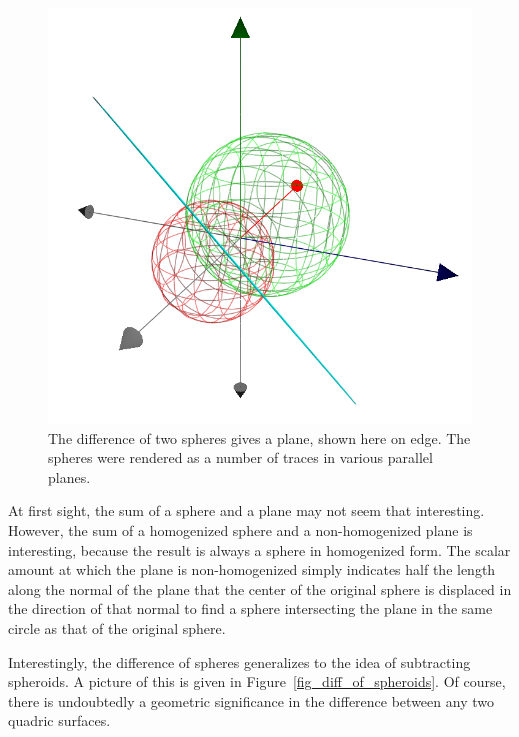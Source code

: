 \documentclass{ecgd-l}
\theoremstyle{definition}
\theoremstyle{remark}
\numberwithin{equation}{section}
\begin{document}
\begin{figure}
\includegraphics[scale=0.7]{DiffOfSpheres}
\caption{The difference of two spheres gives a plane, shown here on edge.  The spheres were rendered as a number of traces in various parallel planes.}
\label{fig_diff_of_spheres}
\end{figure}

At first sight, the sum of a sphere and a plane may not seem that interesting.
However, the sum of a homogenized sphere and a non-homogenized plane is
interesting, because the result is always a sphere in homogenized form.  The
scalar amount at which the plane is non-homogenized simply indicates half
the length along the normal of the plane that the center of the original sphere
is displaced in the direction of that normal to find a sphere intersecting the
plane in the same circle as that of the original sphere.

Interestingly, the difference of spheres generalizes to the idea of subtracting
spheroids.  A picture of this is given in Figure~\ref{fig_diff_of_spheroids}.
Of course, there is undoubtedly a geometric significance in the difference
between any two quadric surfaces.
\end{document}
